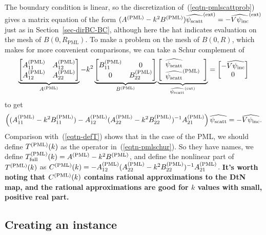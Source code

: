 The boundary condition is linear, so the discretization
of~(\ref{eqtn-pmlscattprob}) gives a matrix equation
of the form 
$(A^{(\text{PML})} - k^2 B^{(\text{PML})})\widehat{\psi_{\text{scatt}}}^{(\text{ext})} 
= -\widehat{V\psi_{\text{inc}}}^{(\text{ext})}$
just as in Section~\ref{sec-dirBC-BC},
although here the hat indicates evaluation on the mesh of
$B(0,R_{\text{PML}})$. To make a problem on the mesh of
$B(0,R)$, which makes for more convenient comparisons, we can
take a Schur complement of
\begin{equation}
\underbrace{
\begin{bmatrix}A^{(\text{PML})}_{11} & A^{(\text{PML})}_{12} \\ 
               A^{(\text{PML})}_{12} & A^{(\text{PML})}_{22}\end{bmatrix}}_{A^{(\text{PML})}}
- k^2
\underbrace{
\begin{bmatrix} B^{(\text{PML})}_{11} & 0 \\ 
                         0 & B^{(\text{PML})}_{22}\end{bmatrix}}_{B^{(\text{PML})}}
\underbrace{
 \left[\begin{array}{l}
        \widehat{\psi_{\text{scatt}}} \\
        \widehat{\psi_{\text{scatt}}}^{(\text{PML})}
 \end{array}\right]}_{\widehat{\psi_{\text{scatt}}}^{(\text{ext})}}
 =
 \begin{bmatrix} -\widehat{V\psi_{\text{inc}}} \\ 0 \end{bmatrix}
\end{equation}
to get
\begin{equation}\label{eqtn-pmlschur}
      \left((A^{(\text{PML})}_{11} - k^2 B^{(\text{PML})}_{11}) -
  A^{(\text{PML})}_{12}(A^{(\text{PML})}_{22} - k^2 B^{(\text{PML})}_{22})^{-1}A^{(\text{PML})}_{21}\right)
  \widehat{\psi_{\text{scatt}}} = -\widehat{V\psi_{\text{inc}}}.
\end{equation}
Comparison with~(\ref{eqtn-defT}) shows that in the case of
the PML, we should define $T^{(\text{PML})}(k)$ as the operator
in~(\ref{eqtn-pmlschur}). So they have names, we define
$T^{(\text{PML})}_{\text{full}}(k) = A^{(\text{PML})} - k^2 B^{(\text{PML})}$, and define the
nonlinear part of $T^{(\text{PML})}(k)$ as
$C^{(\text{PML})}(k) = -A^{(\text{PML})}_{12}(A^{(\text{PML})}_{22} - k^2 B^{(\text{PML})}_{22})^{-1} A^{(\text{PML})}_{21}$.
{\bf
It's worth noting that $C^{(\text{PML})}(k)$ contains rational approximations
to the DtN map, and the rational approximations are good for
$k$ values with small, positive real part.}

\subsection{Creating an instance}
\label{sec-pmlBC-create}

